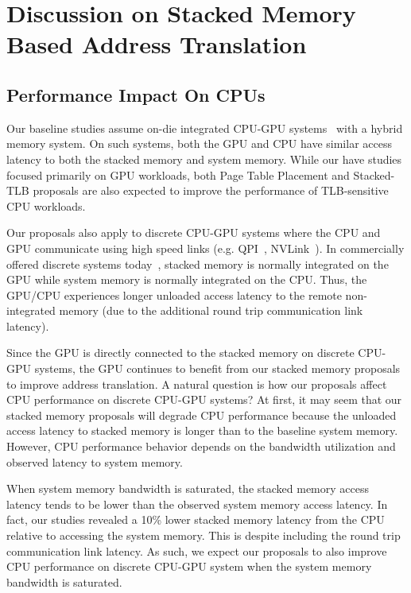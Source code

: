 \section{Discussion on Stacked Memory Based Address Translation} 
\label{sec:implications}

\subsection{Performance Impact On CPUs}

\noindent Our baseline studies assume on-die integrated CPU-GPU
systems~\cite{intelgen9, amdzen} with a hybrid memory system. On such
systems, both the GPU and CPU have similar access latency to both the
stacked memory and system memory. While our have studies focused
primarily on GPU workloads, both Page Table Placement and Stacked-TLB
proposals are also expected to improve the performance of
TLB-sensitive CPU workloads.

Our proposals also apply to discrete CPU-GPU systems where the CPU and
GPU communicate using high speed links (e.g. QPI~\cite{intel_qpi},
NVLink~\cite{bwa}). In commercially offered discrete systems
today~\cite{hbm_intel, hbm_nvidia}, stacked memory is normally
integrated on the GPU while system memory is normally integrated on
the CPU. Thus, the GPU/CPU experiences longer unloaded access latency
to the remote non-integrated memory (due to the additional round trip
communication link latency).

Since the GPU is directly connected to the stacked memory on discrete
CPU-GPU systems, the GPU continues to benefit from our stacked memory
proposals to improve address translation. A natural question is how
our proposals affect CPU performance on discrete CPU-GPU systems? At
first, it may seem that our stacked memory proposals will degrade CPU
performance because the unloaded access latency to stacked memory is
longer than to the baseline system memory. However, CPU performance
behavior depends on the bandwidth utilization and observed latency to
system memory.

When system memory bandwidth is saturated, the stacked memory access
latency tends to be lower than the observed system memory access
latency. In fact, our studies revealed a 10\% lower stacked memory
latency from the CPU relative to accessing the system memory. This is
despite including the round trip communication link latency. As such,
we expect our proposals to also improve CPU performance on discrete
CPU-GPU system when the system memory bandwidth is saturated.

